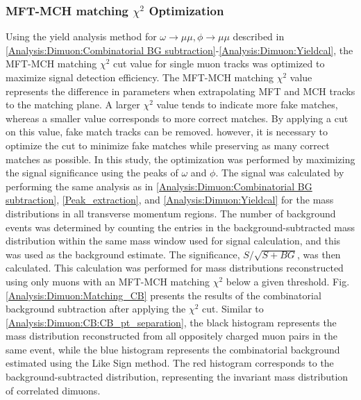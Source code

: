         \subsubsection{MFT-MCH matching $\chi^2$ Optimization}
        \label{matching_chi2_opt}
            Using the yield analysis method for \(\omega \rightarrow \mu\mu, \phi \rightarrow \mu\mu\) described in \ref{Analysis:Dimuon:Combinatorial BG subtraction}-\ref{Analysis:Dimuon:Yieldcal}, the MFT-MCH matching \(\chi^2\) cut value for single muon tracks was optimized to maximize signal detection efficiency. The MFT-MCH matching \(\chi^2\) value represents the difference in parameters when extrapolating MFT and MCH tracks to the matching plane. A larger \(\chi^2\) value tends to indicate more fake matches, whereas a smaller value corresponds to more correct matches. By applying a cut on this value, fake match tracks can be removed. however, it is necessary to optimize the cut to minimize fake matches while preserving as many correct matches as possible. In this study, the optimization was performed by maximizing the signal significance using the peaks of \(\omega\) and \(\phi\).
            The signal was calculated by performing the same analysis as in \ref{Analysis:Dimuon:Combinatorial BG subtraction}, \ref{Peak_extraction}, and \ref{Analysis:Dimuon:Yieldcal} for the mass distributions in all transverse momentum regions. The number of background events was determined by counting the entries in the background-subtracted mass distribution within the same mass window used for signal calculation, and this was used as the background estimate. The significance, \( S/\sqrt{S+BG} \), was then calculated. This calculation was performed for mass distributions reconstructed using only muons with an MFT-MCH matching \(\chi^2\) below a given threshold.  
            Fig. \ref{Analysis:Dimuon:Matching_CB} presents the results of the combinatorial background subtraction after applying the \(\chi^2\) cut. Similar to \ref{Analysis:Dimuon:CB:CB_pt_separation}, the black histogram represents the mass distribution reconstructed from all oppositely charged muon pairs in the same event, while the blue histogram represents the combinatorial background estimated using the Like Sign method. The red histogram corresponds to the background-subtracted distribution, representing the invariant mass distribution of correlated dimuons.
